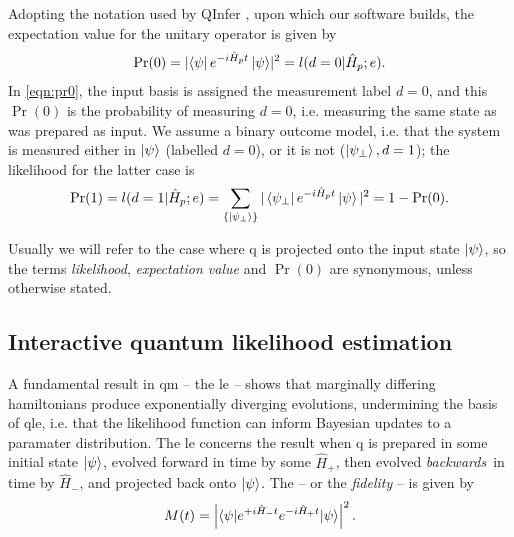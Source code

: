 Adopting the notation used by QInfer \cite{qinfer-1_0}, upon which our software builds, 
the \gls{expectation value} for the unitary operator is given by
\begin{equation}\label{eqn:pr0}
\Pr(0) =  \lvert \bra{\psi} e^{-i \hat{H}_p t} \ket{\psi}\rvert^2  = l(d=0 | \hat{H}_p; e).
\end{equation}
In \cref{eqn:pr0}, the input basis is assigned the measurement label $d=0$, and this $\Pr(0)$ is the probability 
of measuring $d=0$, i.e. measuring the same state as was prepared as input. 
We assume a binary outcome model\footnotemark, 
i.e. that the system is measured either in $\ket{\psi}$ (labelled $d=0$), or it is not ($\ket{\psi_{\perp}}, d=1$);
the \gls{likelihood} for the latter case is
\begin{equation}\label{eqn:pr1}
\Pr(1) = l(d=1 | \hat{H}_p; e) = \sum_{\{\ket{\psi_{\perp}}\}} | \bra{\psi_{\perp}} e^{-i \hat{H}_p t} \ket{\psi}  |^2 = 1 - \Pr(0).
\end{equation}

\par 
Usually we will refer to the case where \gls{q} is projected onto the input state $\ket{\psi}$, 
so the terms \emph{likelihood}, \emph{\gls{expectation value}} and \emph{$\Pr(0)$} are synonymous, 
unless otherwise stated. 


\subsection{Interactive quantum likelihood estimation}\label{sec:iqle}
A fundamental result in \gls{qm} -- the \gls{le} -- shows that marginally differing \glspl{hamiltonian} 
produce exponentially diverging evolutions,  undermining the basis of \gls{qle}, 
i.e. that the likelihood function can inform Bayesian updates to a paramater distribution. 
The \gls{le} concerns the result when \gls{q} is prepared in some initial state $\ket{\psi}$, 
evolved forward in time by some $\hat{H}_+$, then evolved \emph{backwards}\footnotemark \ in time by $\hat{H}_{-}$,
and projected back onto $\ket{\psi}$. 
The  -- or the \emph{fidelity} -- is given by 
\begin{equation}
\label{eqn:loschmidt_echo}
M(t) = \left\lvert  \braket{ \psi | e^{+i\hat{H}_{-} t} e^{-i \hat{H}_{+} t} | \psi}  \right\rvert^2.
\end{equation}
\par

